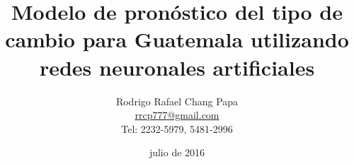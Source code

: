 \title{Modelo de pronóstico del tipo de cambio para Guatemala utilizando redes neuronales artificiales}
\author{Rodrigo Rafael Chang Papa\\\url{rrcp777@gmail.com}\\Tel: 2232-5979, 5481-2996}
\date{julio de 2016}

\thispagestyle{empty}
\noindent
\maketitle
